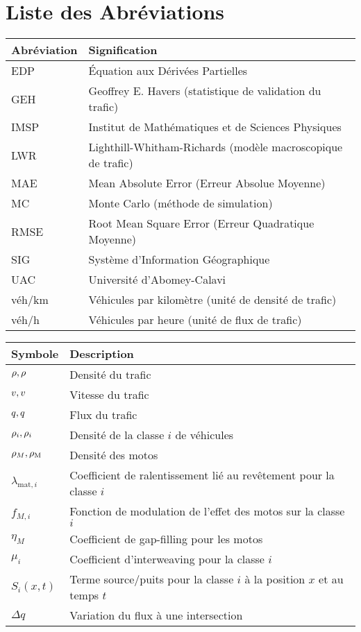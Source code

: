 \chapter*{Liste des Abréviations}
\thispagestyle{fancy}

\begin{tabular}{ll}
\toprule
\textbf{Abréviation} & \textbf{Signification} \\
\midrule
EDP & Équation aux Dérivées Partielles \\
GEH & Geoffrey E. Havers (statistique de validation du trafic) \\
IMSP & Institut de Mathématiques et de Sciences Physiques \\
LWR & Lighthill-Whitham-Richards (modèle macroscopique de trafic) \\
MAE & Mean Absolute Error (Erreur Absolue Moyenne) \\
MC & Monte Carlo (méthode de simulation) \\
RMSE & Root Mean Square Error (Erreur Quadratique Moyenne) \\
SIG & Système d'Information Géographique \\
UAC & Université d'Abomey-Calavi \\
véh/km & Véhicules par kilomètre (unité de densité de trafic) \\
véh/h & Véhicules par heure (unité de flux de trafic) \\
\bottomrule
\end{tabular}

\vspace{1cm}

\begin{tabular}{ll}
\toprule
\textbf{Symbole} & \textbf{Description} \\
\midrule
$\rho, \rho$ & Densité du trafic \\
$v, v$ & Vitesse du trafic \\
$q, q$ & Flux du trafic \\
$\rho_i, \rho_{i}$ & Densité de la classe $i$ de véhicules \\
$\rho_M, \rho_{\text{M}}$ & Densité des motos \\
$\lambda_{\text{mat},i}$ & Coefficient de ralentissement lié au revêtement pour la classe $i$ \\
$f_{M,i}$ & Fonction de modulation de l'effet des motos sur la classe $i$ \\
$\eta_M$ & Coefficient de gap-filling pour les motos \\
$\mu_i$ & Coefficient d'interweaving pour la classe $i$ \\
$S_i(x,t)$ & Terme source/puits pour la classe $i$ à la position $x$ et au temps $t$ \\
$\Delta q$ & Variation du flux à une intersection \\
\bottomrule
\end{tabular}

